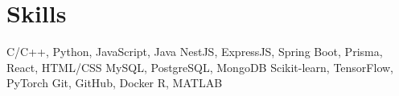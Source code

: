 \section{\textbf{Skills}}
\vspace{-0.4mm}
 \resumeHeadingSkillStart
    {C/C++, Python, JavaScript, Java}
    {NestJS, ExpressJS, Spring Boot, Prisma, React, HTML/CSS}
    {MySQL, PostgreSQL, MongoDB}
    {Scikit-learn, TensorFlow, PyTorch}
    {Git, GitHub, Docker}
    {R, MATLAB}
 \resumeHeadingSkillEnd
 
\vspace{-6mm}
 